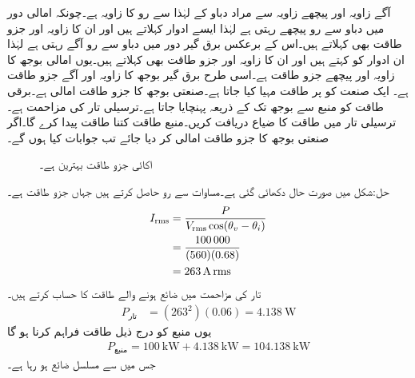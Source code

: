 آگے زاویہ اور پیچھے زاویہ سے مراد دباو کے لہٰذا سے رو کا زاویہ ہے۔چونکہ امالی دور میں دباو سے رو پیچھے رہتی ہے لہٰذا ایسے ادوار  کہلاتے ہیں اور ان کا زاویہ اور جزو طاقت بھی  کہلاتے ہیں۔اس کے برعکس برق گیر دور میں دباو سے رو آگے رہتی ہے لہٰذا ان ادوار کو  کہتے ہیں اور ان کا زاویہ اور جزو طاقت بھی  کہلاتے ہیں۔یوں امالی بوجھ  کا زاویہ   اور پیچھے جزو طاقت  ہے۔اسی طرح برق گیر بوجھ  کا زاویہ  اور آگے جزو طاقت  ہے۔
ایک صنعت کو  پر  طاقت مہیا کیا جاتا ہے۔صنعتی بوجھ کا جزو طاقت  امالی ہے۔برقی طاقت کو منبع سے بوجھ تک  کے ذریعہ پہنچایا جاتا ہے۔ترسیلی تار کی مزاحمت  ہے۔ترسیلی تار میں طاقت کا ضیاع دریافت کریں۔منبع طاقت کتنا طاقت پیدا کرے گا۔اگر صنعتی بوجھ کا جزو طاقت  امالی کر دیا جائے تب جوابات کیا ہوں گے۔
\begin{figure}
\centering
{}
\caption{اکائی جزو طاقت بہترین ہے۔}
\label{شکل_طاقت_جزو_طاقت_کے_اثرات}
\end{figure}

حل:شکل  میں صورت حال دکھائی گئی ہے۔مساوات  سے رو حاصل کرتے ہیں جہاں  جزو طاقت ہے۔
\begin{align*}
{\ensuremath{I_{\textup{rms}}}}&=\frac{P}{{V_{\textup{rms}}} \cos(\theta_v-\theta_i)}\\
&=\frac{\num{100000}}{(560)(0.68)}\\
&=\SI{263}{\ampere}\,{\textup{rms}}
\end{align*}
تار کی مزاحمت میں ضائع ہونے والے طاقت کا حساب کرتے ہیں۔
\begin{align*}
P_{\text{تار}}&=(263^2)(0.06)=\SI{4.138}{\watt}
\end{align*}
یوں منبع کو درج ذیل طاقت فراہم کرنا ہو گا
\begin{align*}
P_{\text{منبع}}=\SI{100}{\kilo\watt}+\SI{4.138}{\kilo\watt}=\SI{104.138}{\kilo\watt}
\end{align*} 
جس میں سے  مسلسل ضائع ہو رہا ہے۔

